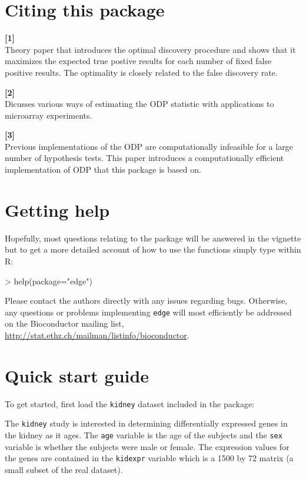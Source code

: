 \documentclass{article}
\begin{document}
\section{Citing this package}

\textbf{[1] } \\
Theory paper that introduces the optimal discovery procedure and shows that it maximizes the expected true postive results for each number of fixed false positive results. The optimality is closely related to the false discovery rate.

\textbf{[2] } \\
Dicusses various ways of estimating the ODP statistic with applications to microarray experiments.

\textbf{[3] } \\
Previous implementations of the ODP are computationally infeasible for a large number of hypothesis tests. This paper introduces a computationally efficient implementation of ODP that this package is based on.

\section{Getting help}
Hopefully, most questions relating to the package will be answered in the vignette but to get a more detailed account of how to use the functions simply type within R:
\begin{Schunk}
\begin{Sinput}
> help(package="edge")
\end{Sinput}
\end{Schunk}
\noindent Please contact the authors directly with any issues regarding bugs. Otherwise, any questions or problems implementing {\tt edge} will most efficiently be addressed on the Bioconductor mailing list, \url{http://stat.ethz.ch/mailman/listinfo/bioconductor}.

\section{Quick start guide}
To get started, first load the {\tt kidney} dataset included in the package: 
\begin{Schunk}
\end{Schunk}
The {\tt kidney} study is interested in determining differentially expressed genes in the kidney as it ages. The {\tt age} variable is the age of the subjects and the {\tt sex} variable is whether the subjects were male or female. The expression values for the genes are contained in the {\tt kidexpr} variable which is a 1500 by 72 matrix (a small subset of the real dataset).
\end{document}
